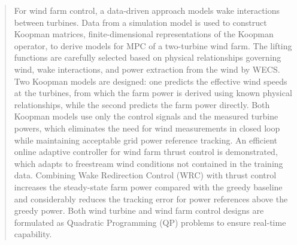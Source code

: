 \documentclass[12pt,a4paper,twoside]{report}
\begin{document}
\begin{abstract}
For wind farm control, a data-driven approach models wake interactions between turbines. Data from a simulation model is used to construct Koopman matrices, finite-dimensional representations of the Koopman operator, to derive models for MPC of a two-turbine wind farm. The lifting functions are carefully selected based on physical relationships governing wind, wake interactions, and power extraction from the wind by WECS. Two Koopman models are designed: one predicts the effective wind speeds at the turbines, from which the farm power is derived using known physical relationships, while the second predicts the farm power directly. Both Koopman models use only the control signals and the measured turbine powers, which eliminates the need for wind measurements in closed loop while maintaining acceptable grid power reference tracking. An efficient online adaptive controller for wind farm thrust control is demonstrated, which adapts to freestream wind conditions not contained in the training data. Combining Wake Redirection Control (WRC) with thrust control increases the steady-state farm power compared with the greedy baseline and considerably reduces the tracking error for power references above the greedy power. Both wind turbine and wind farm control designs are formulated as Quadratic Programming (QP) problems to ensure real-time capability.
\end{abstract}
\cleardoublepage
\end{document}
